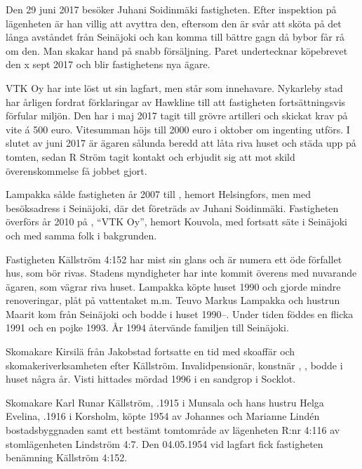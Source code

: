 Den 29 juni 2017 besöker Juhani Soidinmäki fastigheten. Efter inspektion på lägenheten är han villig att avyttra den, eftersom den är svår att sköta på det långa avståndet från Seinäjoki och kan komma till bättre gagn då bybor får rå om den. Man skakar hand på snabb försäljning. Paret undertecknar köpebrevet den x sept 2017 och blir fastighetens nya ägare.



VTK Oy har inte löst ut sin lagfart, men står som innehavare. Nykarleby stad har årligen fordrat förklaringar av Hawkline till att fastigheten fortsättningsvis förfular miljön. Den har i maj 2017 tagit till grövre artilleri och skickat krav på vite á 500 euro. Vitesumman höjs till 2000 euro i oktober om ingenting utförs. I slutet av juni 2017 är ägaren sålunda beredd att låta riva huset och städa upp på tomten, sedan R Ström tagit kontakt och erbjudit sig att mot skild överenskommelse få jobbet gjort.


Lampakka sålde fastigheten år 2007 till , hemort Helsingfors, men med besöksadress i Seinäjoki, där det företräds av Juhani Soidinmäki. Fastigheten överförs år 2010 på , ``VTK Oy'', hemort Kouvola, med fortsatt säte i Seinäjoki och med samma folk i bakgrunden.


Fastigheten Källström 4:152 har mist sin glans och är numera ett öde förfallet hus, som bör rivas. Stadens myndigheter har inte kommit överens med nuvarande ägaren, som vägrar riva huset. Lampakka köpte huset 1990 och gjorde mindre renoveringar, plåt på vattentaket m.m. Teuvo Markus Lampakka och hustrun Maarit kom från Seinäjoki och bodde i huset 1990--. Under tiden föddes en flicka 1991 och en pojke 1993. År 1994 återvände familjen till Seinäjoki.


Skomakare Kirsilä från Jakobstad fortsatte en tid med skoaffär och skomakeriverksamheten	efter Källström. Invalidpensionär, konstnär , , bodde i huset några år. Visti hittades mördad 1996 i en sandgrop i Socklot.


Skomakare Karl Runar Källström, .1915 i Munsala och hans hustru Helga Evelina, .1916 i Korsholm, köpte 1954 av Johannes och Marianne Lindén bostadsbyggnaden samt ett bestämt tomtområde av lägenheten R:nr 4:116  av stomlägenheten Lindström 4:7. Den 04.05.1954 vid lagfart fick fastigheten benämning Källström 4:152.

